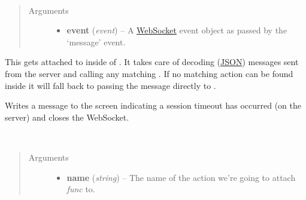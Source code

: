 \documentclass[letterpaper,10pt,openany]{sphinxmanual}
\begin{document}
\begin{fulllineitems}
\begin{fulllineitems}
\begin{fulllineitems}
\label{Developer/js_gateone:GateOne.Net.onMessage}~\begin{quote}\begin{description}
\item[{Arguments}] \leavevmode\begin{itemize}
\item {} 
\textbf{event} (\emph{event}) -- 
A \href{https://developer.mozilla.org/en/WebSockets/WebSockets\_reference/WebSocket}{WebSocket} event object as passed by the `message' event.


\end{itemize}

\end{description}\end{quote}

This gets attached to  inside of {\hyperref[Developer/js_gateone:GateOne.Net.connect]{}}.  It takes care of decoding (\href{https://developer.mozilla.org/en/JSON}{JSON}) messages sent from the server and calling any matching {\hyperref[Developer/js_gateone:GateOne.Net.actions]{}}.  If no matching action can be found inside  it will fall back to passing the message directly to {\hyperref[Developer/js_gateone:GateOne.Visual.displayMessage]{}}.

\end{fulllineitems}



\begin{fulllineitems}
\label{Developer/js_gateone:GateOne.Net.timeoutAction}
Writes a message to the screen indicating a session timeout has occurred (on the server) and closes the WebSocket.

\end{fulllineitems}



\begin{fulllineitems}
\label{Developer/js_gateone:GateOne.Net.addAction}~\begin{quote}\begin{description}
\item[{Arguments}] \leavevmode\begin{itemize}
\item {} 
\textbf{name} (\emph{string}) -- The name of the action we're going to attach \emph{func} to.


\end{itemize}
\end{description}
\end{quote}
\end{fulllineitems}
\end{fulllineitems}
\end{fulllineitems}
\end{document}
